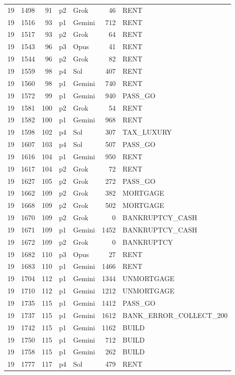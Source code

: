 \begin{longtable}{r r r l l r L{2.2in}}
19 & 1498 & 91 & p2 & Grok & 46 & RENT \\
19 & 1516 & 93 & p1 & Gemini & 712 & RENT \\
19 & 1517 & 93 & p2 & Grok & 64 & RENT \\
19 & 1543 & 96 & p3 & Opus & 41 & RENT \\
19 & 1544 & 96 & p2 & Grok & 82 & RENT \\
19 & 1559 & 98 & p4 & Sol & 407 & RENT \\
19 & 1560 & 98 & p1 & Gemini & 740 & RENT \\
19 & 1572 & 99 & p1 & Gemini & 940 & PASS\_GO \\
19 & 1581 & 100 & p2 & Grok & 54 & RENT \\
19 & 1582 & 100 & p1 & Gemini & 968 & RENT \\
19 & 1598 & 102 & p4 & Sol & 307 & TAX\_LUXURY \\
19 & 1607 & 103 & p4 & Sol & 507 & PASS\_GO \\
19 & 1616 & 104 & p1 & Gemini & 950 & RENT \\
19 & 1617 & 104 & p2 & Grok & 72 & RENT \\
19 & 1627 & 105 & p2 & Grok & 272 & PASS\_GO \\
19 & 1662 & 109 & p2 & Grok & 382 & MORTGAGE \\
19 & 1668 & 109 & p2 & Grok & 502 & MORTGAGE \\
19 & 1670 & 109 & p2 & Grok & 0 & BANKRUPTCY\_CASH \\
19 & 1671 & 109 & p1 & Gemini & 1452 & BANKRUPTCY\_CASH \\
19 & 1672 & 109 & p2 & Grok & 0 & BANKRUPTCY \\
19 & 1682 & 110 & p3 & Opus & 27 & RENT \\
19 & 1683 & 110 & p1 & Gemini & 1466 & RENT \\
19 & 1704 & 112 & p1 & Gemini & 1344 & UNMORTGAGE \\
19 & 1710 & 112 & p1 & Gemini & 1212 & UNMORTGAGE \\
19 & 1735 & 115 & p1 & Gemini & 1412 & PASS\_GO \\
19 & 1737 & 115 & p1 & Gemini & 1612 & BANK\_ERROR\_COLLECT\_200 \\
19 & 1742 & 115 & p1 & Gemini & 1162 & BUILD \\
19 & 1750 & 115 & p1 & Gemini & 712 & BUILD \\
19 & 1758 & 115 & p1 & Gemini & 262 & BUILD \\
19 & 1777 & 117 & p4 & Sol & 479 & RENT \\

\end{longtable}
